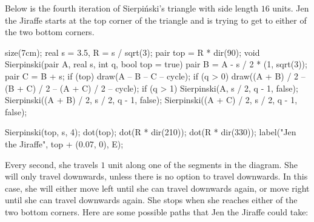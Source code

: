 Below is the fourth iteration of Sierpi\'nski's triangle with side length $16$ units. Jen the Jiraffe starts at the top corner of the triangle and is trying to get to either of the two bottom corners.
	\begin{center}
		\begin{asy}
			size(7cm);
			real s = 3.5, R = s / sqrt(3);
			pair top = R * dir(90);
			void Sierpinski(pair A, real s, int q, bool top = true) {
				pair B = A - s / 2 * (1, sqrt(3));
				pair C = B + s;
				if (top) draw(A -- B -- C -- cycle);
				if (q > 0) draw((A + B) / 2 -- (B + C) / 2 -- (A + C) / 2 -- cycle);
				if (q > 1) {
					Sierpinski(A, s / 2, q - 1, false);
					Sierpinski((A + B) / 2, s / 2, q - 1, false);
					Sierpinski((A + C) / 2, s / 2, q - 1, false);
				}
			}
			
			Sierpinski(top, s, 4);
			dot(top); dot(R * dir(210)); dot(R * dir(330));
			label("Jen the Jiraffe", top + (0.07, 0), E);
		\end{asy}
	\end{center}
	Every second, she travels $1$ unit along one of the segments in the diagram. She will only travel downwards, unless there is no option to travel downwards. In this case, she will either move left until she can travel downwards again, or move right until she can travel downwards again. She stops when she reaches either of the two bottom corners. Here are some possible paths that Jen the Jiraffe could take:
